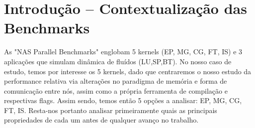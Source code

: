 \documentclass[conference,compsoc]{IEEEtran}
\begin{document}
\section{Introdução -- Contextualização das Benchmarks}
As "NAS Parallel Benchmarks"\cite{nas} englobam 5 kernels (EP, MG, CG, FT, IS) e 3 aplicações  que simulam dinâmica de fluídos (LU,SP,BT). No nosso caso de estudo, temos por interesse os 5 kernels, dado que centraremos o nosso estudo da performance relativa via alterações no paradigma de memória e forma de comunicação entre nós, assim como a própria ferramenta de compilação e respectivas flags. Assim sendo, temos então 5 opções a analisar: EP, MG, CG, FT, IS. Resta-nos portanto analisar primeiramente quais as principais propriedades de cada um antes de qualquer avanço no trabalho. \par 
\end{document}

